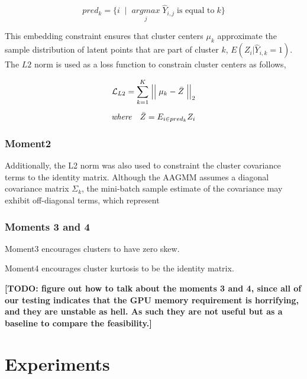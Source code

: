 \documentclass[10pt,twocolumn,letterpaper]{article}
\newcommand{\TODO}[1]{\textbf{\color{red}[TODO: #1]}}
\begin{document}
\begin{equation}
	pred_k = \{i \;\; | \;\; \underset{j}{argmax} \; \hat{Y}_{i,j} \; \text{is equal to} \; k\}
\end{equation}

This embedding constraint ensures that cluster centers $\mu_k$ approximate the sample distribution of latent points that are part of cluster $k$, $E(Z_i|\hat{Y}_{i,k}=1)$. 
The $L2$ norm is used as a loss function to constrain cluster centers as follows,

\begin{equation}
	\begin{aligned}
		\mathcal{L}_{L2} = \sum_{k=1}^K \Bigm\lvert\Bigm\lvert \mu_k - \bar{Z} \Bigm\lvert\Bigm\lvert_2 \\[5pt]
		\textit{where} \quad \bar{Z} = E_{i \in pred_k}Z_i
	\end{aligned}
\end{equation}

\subsubsection{Moment2}

Additionally, the L2 norm was also used to constraint the cluster covariance terms to the identity matrix.
Although the AAGMM assumes a diagonal covariance matrix $\Sigma_k$, the mini-batch sample estimate of the covariance may exhibit off-diagonal terms, which represent

\subsubsection{Moments 3 and 4}

Moment3 encourages clusters to have zero skew. 

Moment4 encourages cluster kurtosis to be the identity matrix. 

\TODO {figure out how to talk about the moments 3 and 4, since all of our testing indicates that the GPU memory requirement is horrifying, and they are unstable as hell. As such they are not useful but as a baseline to compare the feasibility.}





\section{Experiments}
\end{document}
